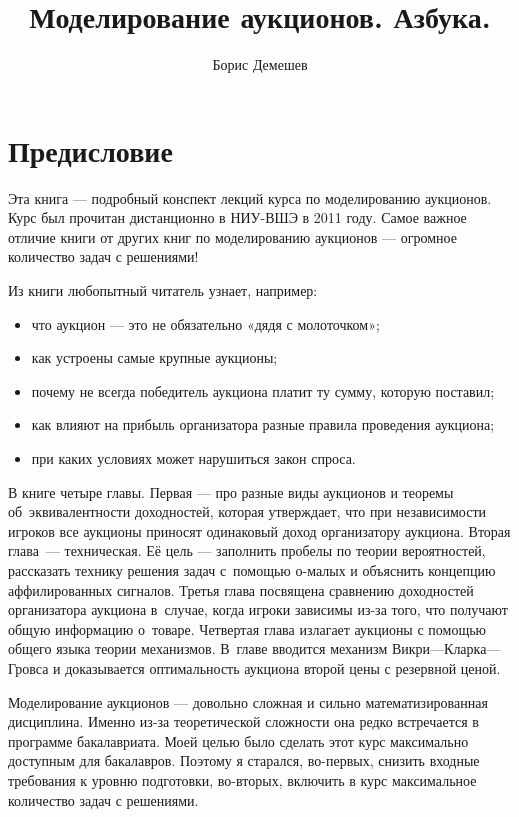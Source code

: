 \documentclass[11pt, openany]{book}
\title{Моделирование аукционов. Азбука. }
\author{Борис Демешев}
\date{}
\numberwithin{equation}{page} %
\theoremstyle{definition} %
\theoremstyle{definition}
\theoremstyle{definition}
\begin{document}
\maketitle
\tableofcontents{}

\chapter*{Предисловие}

Эта книга — подробный конспект лекций курса по моделированию аукционов. Курс был прочитан дистанционно в НИУ-ВШЭ в 2011 году. Самое важное отличие книги от других книг по моделированию аукционов — огромное количество задач с решениями!

Из книги любопытный читатель узнает, например:
\begin{itemize}
\item что аукцион — это не обязательно «дядя с молоточком»;
\item как устроены самые крупные аукционы;
\item почему не всегда победитель аукциона платит ту сумму, которую поставил;
\item как влияют на прибыль организатора разные правила проведения аукциона;
\item при каких условиях может нарушиться закон спроса.
\end{itemize}

В книге четыре главы. Первая — про разные виды аукционов и теоремы об~эквивалентности доходностей, которая утверждает, что при независимости игроков все аукционы приносят одинаковый доход организатору аукциона. Вторая глава~— техническая. Её цель — заполнить пробелы по теории вероятностей, рассказать технику решения задач с~помощью о-малых и объяснить концепцию аффилированных сигналов. Третья глава посвящена сравнению доходностей организатора аукциона в~случае, когда игроки зависимы из-за того, что получают общую информацию о~товаре. Четвертая глава излагает аукционы с помощью общего языка теории механизмов. В~главе вводится механизм Викри—Кларка—Гровса и доказывается оптимальность аукциона второй цены с резервной ценой.

Моделирование аукционов — довольно сложная и сильно математизированная дисциплина. Именно из-за теоретической сложности она редко встречается в программе бакалавриата. Моей целью было сделать этот курс максимально доступным для бакалавров. Поэтому я старался, во-первых, снизить входные требования к уровню подготовки, во-вторых, включить в курс максимальное количество задач с решениями.
\end{document}
